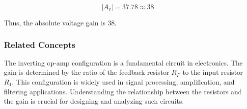 \[
|A_v| = 37.78 \approx 38
\]

Thus, the absolute voltage gain is 38.

\subsubsection{Related Concepts}
The inverting op-amp configuration is a fundamental circuit in electronics. The gain is determined by the ratio of the feedback resistor \( R_F \) to the input resistor \( R_1 \). This configuration is widely used in signal processing, amplification, and filtering applications. Understanding the relationship between the resistors and the gain is crucial for designing and analyzing such circuits.

